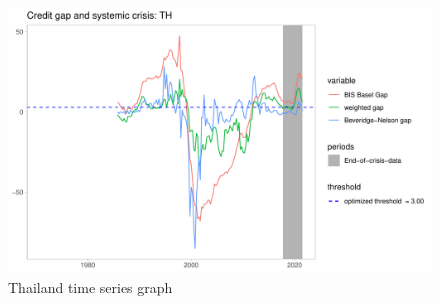 \documentclass[
  12pt,
]{article}
\begin{document}
\begin{figure}[H]

{\centering \includegraphics[width=0.85\linewidth]{../Data/Output/Graphs/All/Weighted_credit_gap_TH} 

}

\caption{Thailand time series graph}\label{fig:THseries}
\end{figure}
\end{document}
